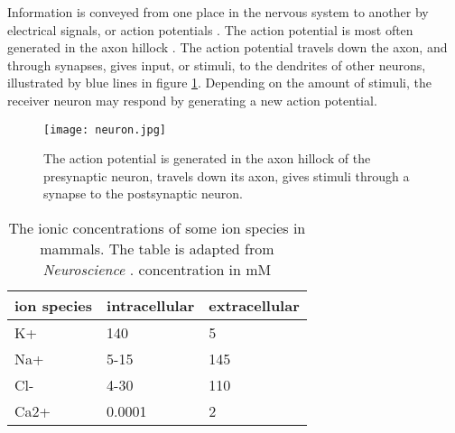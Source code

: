 \documentclass{article}
\begin{document}
Information is conveyed from one place in the nervous system to another by electrical signals, or action potentials \cite{Neuroscience}. The action potential is most often generated in the axon hillock \cite{newworldencyclopedia}. The action potential travels down the axon, and through synapses, gives input, or stimuli, to the dendrites of other neurons, illustrated by blue lines in figure \ref{fig:neuron}. Depending on the amount of stimuli, the receiver neuron may respond by generating a new action potential. 


\begin{figure}
  \texttt{[image: neuron.jpg]}
  \caption{The action potential is generated in the axon hillock of the presynaptic neuron, travels down its axon, gives stimuli through a synapse to the postsynaptic neuron. \cite{fig:neuron} }
  \label{fig:neuron}
\end{figure}

\begin{table}[h!]
  \centering
  \caption{The ionic concentrations of some ion species in mammals. The table is adapted from \textit{Neuroscience} \cite{Neuroscience}. concentration in mM}
  \label{tab:ionic_concentrations}
  \begin{tabular}{l||l|l}
ion species & intracellular & extracellular \\
\hline
K+ & 140 & 5  \\
Na+ & 5-15 & 145 \\
Cl- & 4-30 & 110 \\
Ca2+ & 0.0001 & 2  \\
 \end{tabular}
\end{table}
\end{document}

